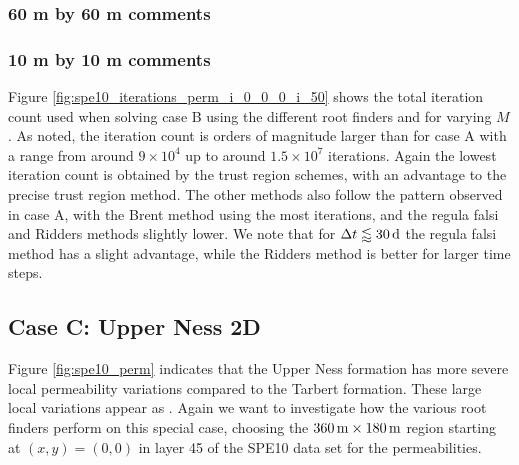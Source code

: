 

\subsubsection{60 m by 60 m comments}



\clearpage
\subsubsection{10 m by 10 m comments}

Figure \ref{fig:spe10_iterations_perm_i_0_0_0_i_50} shows the total iteration count used when solving case B using the different root finders and for varying $M$. As noted, the iteration count is orders of magnitude larger than for case A with a range from around $9\times 10^4$ up to around $1.5\times 10^7$ iterations. Again the lowest iteration count is obtained by the trust region schemes, with an advantage to the precise trust region method. The other methods also follow the pattern observed in case A, with the Brent method using the most iterations, and the regula falsi and Ridders methods slightly lower. We note that for $\Delta t \lessapprox \unit[30]{d}$ the regula falsi method has a slight advantage, while the Ridders method is better for larger time steps. 


%

\clearpage
\subsection{Case C: Upper Ness 2D}
\label{section:caseC}
Figure \ref{fig:spe10_perm} indicates that the Upper Ness formation has more severe local permeability variations compared to the Tarbert formation. These large local variations appear as . Again we want to investigate how the various root finders perform on this special case, choosing the $\unit[360]{m}\times \unit[180]{m}$ region starting at $(x,y) = (0,0)$ in layer 45 of the SPE10 data set for the permeabilities.




